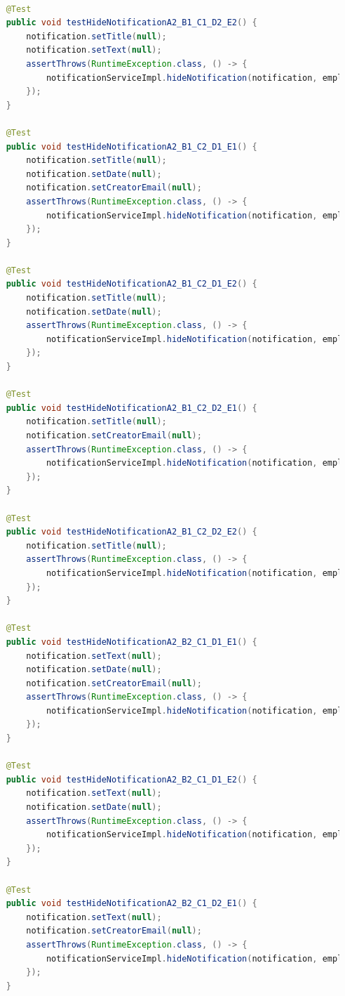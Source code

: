 \newpage
\begin{lstlisting}[language=java]

    @Test
    public void testHideNotificationA2_B1_C1_D2_E2() {
        notification.setTitle(null);
        notification.setText(null);
        assertThrows(RuntimeException.class, () -> {
            notificationServiceImpl.hideNotification(notification, employee);
        });
    }

    @Test
    public void testHideNotificationA2_B1_C2_D1_E1() {
        notification.setTitle(null);
        notification.setDate(null);
        notification.setCreatorEmail(null);
        assertThrows(RuntimeException.class, () -> {
            notificationServiceImpl.hideNotification(notification, employee);
        });
    }

    @Test
    public void testHideNotificationA2_B1_C2_D1_E2() {
        notification.setTitle(null);
        notification.setDate(null);
        assertThrows(RuntimeException.class, () -> {
            notificationServiceImpl.hideNotification(notification, employee);
        });
    }

    @Test
    public void testHideNotificationA2_B1_C2_D2_E1() {
        notification.setTitle(null);
        notification.setCreatorEmail(null);
        assertThrows(RuntimeException.class, () -> {
            notificationServiceImpl.hideNotification(notification, employee);
        });
    }

    @Test
    public void testHideNotificationA2_B1_C2_D2_E2() {
        notification.setTitle(null);
        assertThrows(RuntimeException.class, () -> {
            notificationServiceImpl.hideNotification(notification, employee);
        });
    }

    @Test
    public void testHideNotificationA2_B2_C1_D1_E1() {
        notification.setText(null);
        notification.setDate(null);
        notification.setCreatorEmail(null);
        assertThrows(RuntimeException.class, () -> {
            notificationServiceImpl.hideNotification(notification, employee);
        });
    }

    @Test
    public void testHideNotificationA2_B2_C1_D1_E2() {
        notification.setText(null);
        notification.setDate(null);
        assertThrows(RuntimeException.class, () -> {
            notificationServiceImpl.hideNotification(notification, employee);
        });
    }

    @Test
    public void testHideNotificationA2_B2_C1_D2_E1() {
        notification.setText(null);
        notification.setCreatorEmail(null);
        assertThrows(RuntimeException.class, () -> {
            notificationServiceImpl.hideNotification(notification, employee);
        });
    }


\end{lstlisting}
